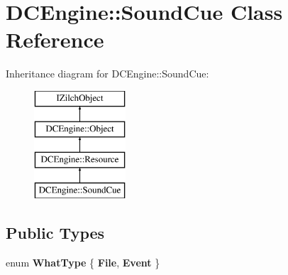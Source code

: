 \hypertarget{classDCEngine_1_1SoundCue}{\section{D\-C\-Engine\-:\-:Sound\-Cue Class Reference}
\label{classDCEngine_1_1SoundCue}
}
Inheritance diagram for D\-C\-Engine\-:\-:Sound\-Cue\-:\begin{figure}[H]
\begin{center}
\leavevmode
\includegraphics[height=4.000000cm]{classDCEngine_1_1SoundCue}
\end{center}
\end{figure}
\subsection*{Public Types}
\begin{DoxyCompactItemize}
\item 
enum {\bfseries What\-Type} \{ {\bfseries File}, 
{\bfseries Event}
 \}
\end{DoxyCompactItemize}
